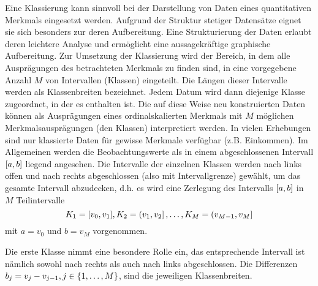 \documentclass{lecture}
\begin{document}
    Eine Klassierung kann sinnvoll bei der Darstellung von Daten eines quantitativen Merkmals eingesetzt werden.
    Aufgrund der Struktur stetiger Datensätze eignet sie sich besonders zur deren Aufbereitung.
    Eine Strukturierung der Daten erlaubt deren leichtere Analyse und ermöglicht eine aussagekräftige graphische Aufbereitung.
    Zur Umsetzung der Klassierung wird der Bereich, in dem alle Ausprägungen des betrachteten Merkmals zu finden sind, in eine vorgegebene Anzahl \(M\) von Intervallen (Klassen) eingeteilt.
    Die Längen dieser Intervalle werden als Klassenbreiten bezeichnet.
    Jedem Datum wird dann diejenige Klasse zugeordnet, in der es enthalten ist.
    Die auf diese Weise neu konstruierten Daten können als Ausprägungen eines ordinalskalierten Merkmals mit \(M\) möglichen Merkmalsausprägungen (den Klassen) interpretiert werden.
    In vielen Erhebungen sind nur klassierte Daten für gewisse Merkmale verfügbar (z.B. Einkommen).
    Im Allgemeinen werden die Beobachtungswerte als in einem abgeschlossenen Intervall \(\brackets*{a, b}\) liegend angesehen.
    Die Intervalle der einzelnen Klassen werden nach links offen und nach rechts abgeschlossen (also mit Intervallgrenze) gewählt, um das gesamte Intervall abzudecken, d.h. es wird eine Zerlegung des Intervalls \(\brackets*{a, b}\) in \(M\) Teilintervalle
    \[
        K_1 = \brackets*{v_0, v_1}, K_2 = \left(v_1, v_2\right], \ldots, K_M = \left(v_{M - 1}, v_M\right]
    \]
    mit \(a = v_0\) und \(b = v_M\) vorgenommen.
    \begin{center}
    \end{center}
    Die erste Klasse nimmt eine besondere Rolle ein, das entsprechende Intervall ist nämlich sowohl nach rechts als auch nach links abgeschlossen.
    Die Differenzen \(b_j = v_j - v_{j - 1}, j \in \braces*{1, \ldots, M}\), sind die jeweiligen Klassenbreiten.
\end{document}
